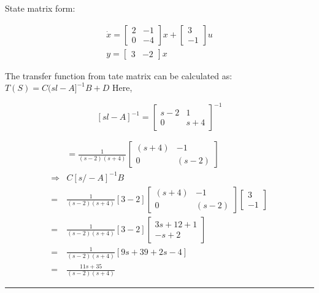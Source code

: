 \documentclass[11pt,a4paper]{article}
\begin{document}
\begin{tcolorbox}[solbox, title=Detailed Solution -- Question 74]
State matrix form:

\[
\begin{array}{l} \dot{x}=\left[\begin{array}{cc} 2 & -1 \\ 0 & -4 \end{array}\right] x+\left[\begin{array}{c} 3 \\ -1 \end{array}\right] u \\ y=\left[\begin{array}{ll} 3 & -2 \end{array}\right] x \end{array}
\]

 The transfer function from tate matrix can be calculated as:
$T(S)=C(s l-A]^{-1} B+D$
 Here,

\[
[s l-A]^{-1}=\left[\begin{array}{cc} s-2 & 1 \\ 0 & s+4 \end{array}\right]^{-1}
\]

\[
\begin{aligned} &=\frac{1}{(s-2)(s+4)}\left[\begin{array}{cc} (s+4) & -1 \\ 0 & (s-2) \end{array}\right] \\ \Rightarrow &C[s /-A]^{-1} B \\ =& \frac{1}{(s-2)(s+4)}[3-2]\left[\begin{array}{cc} (s+4) & -1 \\ 0 & (s-2) \end{array}\right]\left[\begin{array}{c} 3 \\ -1 \end{array}\right] \\ =& \frac{1}{(s-2)(s+4)}[3-2]\left[\begin{array}{c} 3 s+12+1 \\ -s+2 \end{array}\right] \\ =& \frac{1}{(s-2)(s+4)}[9 s+39+2 s-4] \\ =& \frac{11 s+35}{(s-2)(s+4)} \end{aligned}
\]
\end{tcolorbox}

\vspace{1.5em}
\hrule
\vspace{1.5em}
\end{document}
